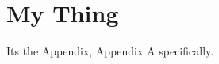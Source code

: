 \pagestyle{plain}
\setcounter{chapter}{0}
\appendix
\chapter{My Thing} \label{chap:boerasAppendix}
\renewcommand{\thetable}{\Alph{chapter}.\arabic{table}}  
\renewcommand{\thefigure}{\Alph{chapter}.\arabic{figure}} 

Its the Appendix, Appendix A specifically.